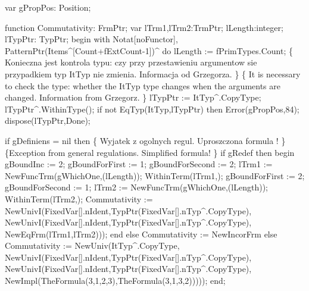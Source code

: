 var
   gPropPos: Position;
   
   function Commutativity: FrmPtr;
   var lTrm1,lTrm2:TrmPtr; lLength:integer;
   lTypPtr: TypPtr;
   begin
      with Notat[noFunctor], PatternPtr(Items^[Count+fExtCount-1])^ do
                                lLength := fPrimTypes.Count;
      \{ Konieczna jest kontrola typu: czy przy przestawieniu argumentow
        sie przypadkiem typ ItTyp nie zmienia.
        Informacja od Grzegorza.
      \}
      \{ It is necessary to check the type: whether the ItTyp type changes
        when the arguments are changed. Information from Grzegorz. \}
      lTypPtr := ItTyp^.CopyType;
      lTypPtr^.WithinType();
      if not EqTyp(ItTyp,lTypPtr) then Error(gPropPos,84);
      dispose(lTypPtr,Done);
      
      if gDefiniens = nil then
         \{ Wyjatek z ogolnych regul. Uproszczona formula ! \}
         \{Exception from general regulations. Simplified formula! \}
         if gRedef then
         begin
            gBoundInc := 2;
            gBoundForFirst := 1; gBoundForSecond := 2;
            lTrm1 := NewFuncTrm(gWhichOne,(lLength));
            WithinTerm(lTrm1,);
            gBoundForFirst := 2; gBoundForSecond := 1;
            lTrm2 := NewFuncTrm(gWhichOne,(lLength));
            WithinTerm(lTrm2,);
            Commutativity := 
               NewUnivI(FixedVar[].nIdent,TypPtr(FixedVar[].nTyp^.CopyType),
                        NewUnivI(FixedVar[].nIdent,TypPtr(FixedVar[].nTyp^.CopyType),
                                 NewEqFrm(lTrm1,lTrm2)));
         end
         else Commutativity := NewIncorFrm
         else
            Commutativity := 
               NewUniv(ItTyp^.CopyType,
                       NewUnivI(FixedVar[].nIdent,TypPtr(FixedVar[].nTyp^.CopyType),
                                NewUnivI(FixedVar[].nIdent,TypPtr(FixedVar[].nTyp^.CopyType),
                                         NewImpl(TheFormula(3,1,2,3),TheFormula(3,1,3,2)))));
   end;
   
